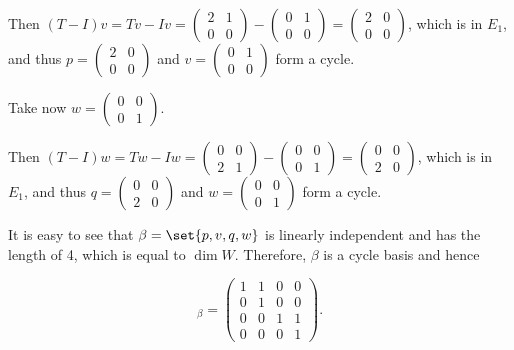 \documentclass[11pt]{scrartcl}
\begin{document}
\begin{soln}
Then $(T- I)v = Tv - Iv = 
\begin{pmatrix}
2 & 1\\
0 & 0
\end{pmatrix} - \begin{pmatrix}
0 & 1\\
0 & 0
\end{pmatrix}= 
  \begin{pmatrix}
2 & 0\\
0 & 0
\end{pmatrix}$, which is in $E_{1}$, and thus
$p=\begin{pmatrix}
2 & 0\\
0 & 0
\end{pmatrix}$ and 
$v=\begin{pmatrix}
0 & 1\\
0 & 0
\end{pmatrix}$ form a cycle.

Take now $w =
\begin{pmatrix}
0 & 0\\
0 & 1
\end{pmatrix}$.

Then $(T- I)w = Tw - Iw = 
\begin{pmatrix}
0 & 0\\
2 & 1
\end{pmatrix} - \begin{pmatrix}
0 & 0\\
0 & 1
\end{pmatrix}= 
  \begin{pmatrix}
0 & 0\\
2 & 0
\end{pmatrix}$, which is in $E_{1}$, and thus
$q=\begin{pmatrix}
0 & 0\\
2 & 0
\end{pmatrix}$ and 
$ w= \begin{pmatrix}
0 & 0\\
0 & 1
\end{pmatrix}$ form a cycle.

It is easy to see that $\beta = \set{p, v, q, w}$ is linearly
independent and has the length of 4, which is equal to $\dim
W$. Therefore, $\beta$ is a cycle basis and hence


\begin{equation*}
  [A]_{\beta} = 
  \begin{pmatrix}
    1 & 1 & 0 & 0\\
    0 & 1 & 0 & 0\\
    0 & 0 & 1 & 1\\
    0 & 0 & 0 & 1
  \end{pmatrix}.
\end{equation*}

\end{soln}
\end{document}
